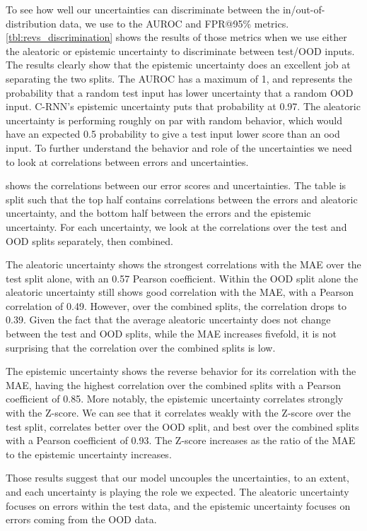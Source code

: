 To see how well our uncertainties can discriminate between the in/out-of-distribution data, we use to the AUROC and FPR@95\% metrics. \cref{tbl:revs_discrimination} shows the results of those metrics when we use either the aleatoric or epistemic uncertainty to discriminate between test/OOD inputs. The results clearly show that the epistemic uncertainty does an excellent job at separating the two splits. The AUROC has a maximum of 1, and represents the probability that a random test input has lower uncertainty that a random OOD input. C-RNN's epistemic uncertainty puts that probability at 0.97. The aleatoric uncertainty is performing roughly on par with random behavior, which would have an expected 0.5 probability to give a test input lower score than an ood input.
To further understand the behavior and role of the uncertainties we need to look at correlations between errors and uncertainties. 


 shows the correlations between our error scores and uncertainties. The table is split such that the top half contains correlations between the errors and aleatoric uncertainty, and the bottom half between the errors and the epistemic uncertainty. For each uncertainty, we look at the correlations over the test and OOD splits separately, then combined.  

The aleatoric uncertainty shows the strongest correlations with the MAE over the test split alone, with an 0.57 Pearson coefficient. Within the OOD split alone the aleatoric uncertainty still shows good correlation with the MAE, with a Pearson correlation of 0.49. However, over the combined splits, the correlation drops to 0.39. Given the fact that the average aleatoric uncertainty does not change between the test and OOD splits, while the MAE increases fivefold, it is not surprising that the correlation over the combined splits is low. 

The epistemic uncertainty shows the reverse behavior for its correlation with the MAE, having the highest correlation over the combined splits with a Pearson coefficient of 0.85. More notably, the epistemic uncertainty correlates strongly with the Z-score. We can see that it correlates weakly with the Z-score over the test split, correlates better over the OOD split, and best over the combined splits with a Pearson coefficient of 0.93. The Z-score increases as the ratio of the MAE to the epistemic uncertainty increases. 

Those results suggest that our model uncouples the uncertainties, to an extent, and each uncertainty is playing the role we expected. The aleatoric uncertainty focuses on errors within the test data, and the epistemic uncertainty focuses on errors coming from the OOD data. 

